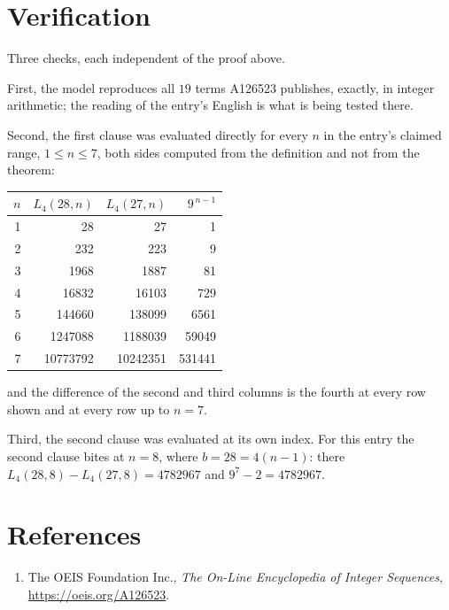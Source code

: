 \documentclass[11pt,a4paper]{article}
\theoremstyle{plain}
\theoremstyle{definition}
\begin{document}
\section{Verification}

Three checks, each independent of the proof above.

First, the model reproduces all $19$ terms A126523 publishes, exactly, in integer
arithmetic; the reading of the entry's English is what is being tested there.

Second, the first clause was evaluated directly for every $n$ in the entry's claimed range,
$1\le n\le7$, both sides computed from the definition and not from the theorem:

\begin{center}
\begin{tabular}{rrrr}
$n$ & $L_{4}(28,n)$ & $L_{4}(27,n)$ & $9^{\,n-1}$ \\ \hline
1 & 28 & 27 & 1 \\
2 & 232 & 223 & 9 \\
3 & 1968 & 1887 & 81 \\
4 & 16832 & 16103 & 729 \\
5 & 144660 & 138099 & 6561 \\
6 & 1247088 & 1188039 & 59049 \\
7 & 10773792 & 10242351 & 531441 \\
\end{tabular}
\end{center}

\noindent and the difference of the second and third columns is the fourth at every row shown
and at every row up to $n=7$.

Third, the second clause was evaluated at its own index. For this entry the second clause bites at $n=8$, where $b=28=4(n-1)$: there $L_{4}(28,8)-L_{4}(27,8)=4782967$ and $9^{7}-2=4782967$.

\section*{References}
\begin{enumerate}
\item The OEIS Foundation Inc., \emph{The On-Line Encyclopedia of Integer Sequences},
\url{https://oeis.org/A126523}.
\end{enumerate}
\end{document}
